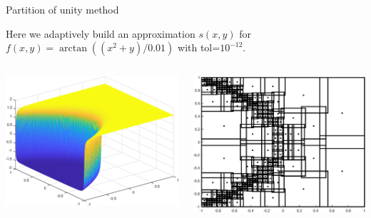\documentclass{beamer}
\newcommand{\lp}{\left(}
\newcommand{\rp}{\right)}
\begin{document}
\begin{frame}{Partition of unity method}

\begin{center}
Here we adaptively build an approximation $s(x,y)$ for $f(x,y) = \arctan \lp \lp x^2+y \rp/0.01 \rp$ with tol=$10^{-12}$.
\end{center}

\begin{columns}[t]

\begin{column}{0.5\textwidth}	
\begin{center}
\includegraphics[scale = 0.3]{tan2Dplot.eps}	
\end{center}
\end{column}

\begin{column}{0.5\textwidth}
\begin{center}
\includegraphics[scale = 0.3]{tan2Dsubdomains.eps}	
\end{center}
\end{column}


\end{columns}
\end{frame}
\end{document}
